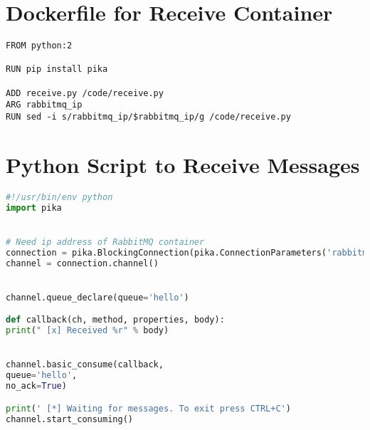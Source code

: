 \section{Dockerfile for Receive Container} \label{receive-dockerfile}
\begin{lstlisting}
FROM python:2

RUN pip install pika

ADD receive.py /code/receive.py
ARG rabbitmq_ip
RUN sed -i s/rabbitmq_ip/$rabbitmq_ip/g /code/receive.py
\end{lstlisting}

\section{Python Script to Receive Messages} \label{receive-script}
\begin{lstlisting}[language=python]
#!/usr/bin/env python
import pika


# Need ip address of RabbitMQ container
connection = pika.BlockingConnection(pika.ConnectionParameters('rabbitmq_ip'))
channel = connection.channel()


channel.queue_declare(queue='hello')

def callback(ch, method, properties, body):
print(" [x] Received %r" % body)


channel.basic_consume(callback,
queue='hello',
no_ack=True)

print(' [*] Waiting for messages. To exit press CTRL+C')
channel.start_consuming()
\end{lstlisting}